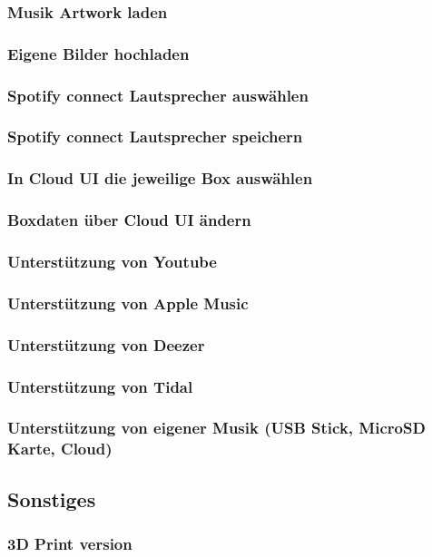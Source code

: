 \documentclass[10pt, a4paper, draft]{article}
\begin{document}
\subsubsection{Musik Artwork laden}
\subsubsection{Eigene Bilder hochladen}
\subsubsection{Spotify connect Lautsprecher auswählen}
\subsubsection{Spotify connect Lautsprecher speichern}
\subsubsection{In Cloud UI die jeweilige Box auswählen}
\subsubsection{Boxdaten über Cloud UI ändern}
\subsubsection{Unterstützung von Youtube}
\subsubsection{Unterstützung von Apple Music}
\subsubsection{Unterstützung von Deezer}
\subsubsection{Unterstützung von Tidal}
\subsubsection{Unterstützung von eigener Musik (USB Stick, MicroSD Karte, Cloud)}

\subsection{Sonstiges}
\subsubsection{3D Print version}
\end{document}
